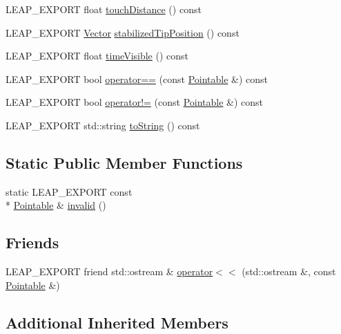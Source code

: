 \begin{DoxyCompactItemize}
L\+E\+A\+P\+\_\+\+E\+X\+P\+O\+R\+T float \hyperlink{class_leap_1_1_pointable_a20ea59c9efc41133255301a898d48592}{touch\+Distance} () const 
\item 
L\+E\+A\+P\+\_\+\+E\+X\+P\+O\+R\+T \hyperlink{struct_leap_1_1_vector}{Vector} \hyperlink{class_leap_1_1_pointable_ae80139b0c44868f570bdcb6f2f7417ec}{stabilized\+Tip\+Position} () const 
\item 
L\+E\+A\+P\+\_\+\+E\+X\+P\+O\+R\+T float \hyperlink{class_leap_1_1_pointable_a7fbc47bef4194a619ca0a0d2756ed48b}{time\+Visible} () const 
\item 
L\+E\+A\+P\+\_\+\+E\+X\+P\+O\+R\+T bool \hyperlink{class_leap_1_1_pointable_a1b5dd8315f944e3dd2d7f7247c28781f}{operator==} (const \hyperlink{class_leap_1_1_pointable}{Pointable} \&) const 
\item 
L\+E\+A\+P\+\_\+\+E\+X\+P\+O\+R\+T bool \hyperlink{class_leap_1_1_pointable_af6f3872bfd84553e9ca53c49457f8c1f}{operator!=} (const \hyperlink{class_leap_1_1_pointable}{Pointable} \&) const 
\item 
L\+E\+A\+P\+\_\+\+E\+X\+P\+O\+R\+T std\+::string \hyperlink{class_leap_1_1_pointable_ab40247dc558a04b53110da3c45059371}{to\+String} () const 
\end{DoxyCompactItemize}
\subsection*{Static Public Member Functions}
\begin{DoxyCompactItemize}
\item 
static L\+E\+A\+P\+\_\+\+E\+X\+P\+O\+R\+T const \\*
\hyperlink{class_leap_1_1_pointable}{Pointable} \& \hyperlink{class_leap_1_1_pointable_a2d66e938c10bf54778fdfe5abf7dd77d}{invalid} ()
\end{DoxyCompactItemize}
\subsection*{Friends}
\begin{DoxyCompactItemize}
\item 
L\+E\+A\+P\+\_\+\+E\+X\+P\+O\+R\+T friend std\+::ostream \& \hyperlink{class_leap_1_1_pointable_a3e0fe2f963f09cfaf2d4dc9b93c85b4d}{operator$<$$<$} (std\+::ostream \&, const \hyperlink{class_leap_1_1_pointable}{Pointable} \&)
\end{DoxyCompactItemize}
\subsection*{Additional Inherited Members}


